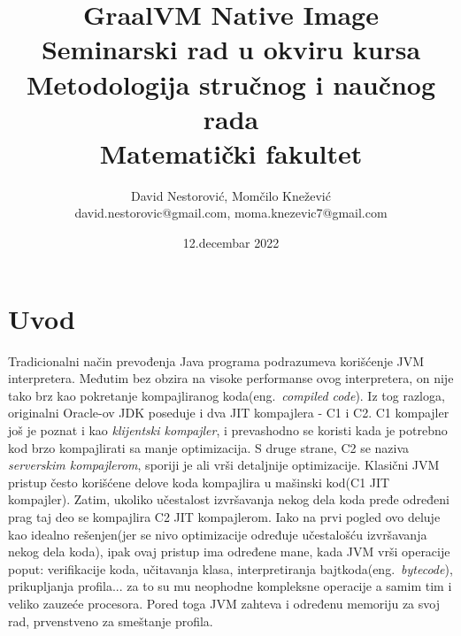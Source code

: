 \documentclass[a4paper]{article}
\begin{document}
\title{GraalVM Native Image\\ \small{Seminarski rad u okviru kursa\\Metodologija stručnog i naučnog rada\\ Matematički fakultet}}

\author{David Nestorović, Momčilo Knežević\\ david.nestorovic@gmail.com, moma.knezevic7@gmail.com}

\date{12.decembar 2022}

\maketitle


\tableofcontents

\newpage
\section{Uvod}
\label{sec:uvod}
 Tradicionalni način prevođenja Java programa podrazumeva korišćenje JVM interpretera. Međutim bez obzira na visoke performanse ovog interpretera, on nije tako brz kao pokretanje kompajliranog koda(eng.~{\em compiled code}). Iz tog razloga, originalni Oracle-ov JDK poseduje i dva JIT kompajlera - C1 i C2. C1 kompajler još je poznat i kao \textit{klijentski kompajler}, i prevashodno se koristi kada je potrebno kod brzo kompajlirati sa manje optimizacija. S druge strane, C2 se naziva \textit{serverskim kompajlerom}, sporiji je ali vrši detaljnije optimizacije. Klasični JVM pristup često korišćene delove koda kompajlira u mašinski kod(C1 JIT kompajler). Zatim, ukoliko učestalost izvršavanja nekog dela koda pređe određeni prag taj deo se kompajlira C2 JIT kompajlerom. Iako na prvi pogled ovo deluje kao idealno rešenjen(jer se nivo optimizacije određuje učestalošću izvršavanja nekog dela koda), ipak ovaj pristup ima određene mane, kada JVM vrši operacije poput: verifikacije koda, učitavanja klasa, interpretiranja bajtkoda(eng.~{\em bytecode}), prikupljanja profila... za to su mu neophodne kompleksne operacije a samim tim i veliko zauzeće procesora. Pored toga JVM zahteva i određenu memoriju za svoj rad, prvenstveno za smeštanje profila. \cite{Uvod}
 
\end{document}
